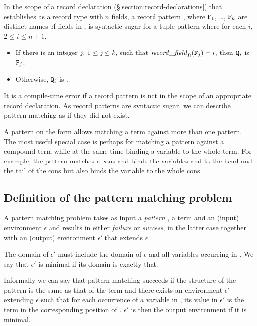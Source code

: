In the scope of a record declaration
(\S\ref{section:record-declarations}) that establishes  as a
record type with $n$ fields, a record pattern
,
where ${\tt{\sl F}}_1$, \ldots, ${\tt{\sl F}}_k$ are distinct names of fields in
, is syntactic sugar for a tuple pattern
where for each $i$, $2\leq i\leq n+1$,
\begin{itemize}
\item If there is an integer $j$, $1\leq j\leq k$, such that
$\mathit{record\_field}_{\mbox{\scriptsize\tt{\sl{R}}}}({\tt{\sl F}}_j)=i$, then
${\tt{\sl Q}}_i$ is ${\tt{\sl P}}_j$.
\item Otherwise, ${\tt{\sl Q}}_i$ is \T{_}.
\end{itemize}
It is a compile-time error if a record pattern is not in the scope of
an appropriate record declaration.  As record patterns are syntactic
sugar, we can describe pattern matching as if they did not exist.

A pattern on the form  allows matching a term
against more than one pattern.  The most useful special case is
perhaps for matching a pattern against a compound term while at the
same time binding a variable to the whole term.  For example, the
pattern  matches a cons and binds the variables
 and  to the head and the tail of the cons but also binds
the variable  to the whole cons.

\subsection{Definition of the pattern matching problem}

A pattern matching problem takes as input a \emph{pattern} , a
term  and an (input) environment $\epsilon$ and results in
either \emph{failure} or \emph{success}, in the latter case together
with an (output) environment $\epsilon'$ that extends $\epsilon$.

The domain of $\epsilon'$ must include the domain of $\epsilon$ and
all variables occurring in .  We say that $\epsilon'$ is minimal
if its domain is exactly that.

Informally we can say that pattern matching succeeds if the structure
of the pattern  is the same as that of the term  and there
exists an environment $\epsilon'$ extending $\epsilon$ such that for
each occurrence of a variable in , its value in $\epsilon'$ is
the term in the corresponding position of .  $\epsilon'$ is then
the output environment if it is minimal.

